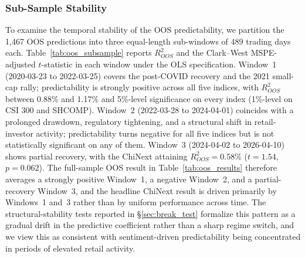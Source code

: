 \documentclass[AER]{AEA}
\begin{document}
\subsubsection{Sub-Sample Stability}
To examine the temporal stability of the OOS predictability, we partition the 1{,}467 OOS predictions into three equal-length sub-windows of 489 trading days each. Table~\ref{tab:oos_subsample} reports $R^2_{OOS}$ and the Clark--West MSPE-adjusted $t$-statistic in each window under the OLS specification. Window~1 (2020-03-23 to 2022-03-25) covers the post-COVID recovery and the 2021 small-cap rally; predictability is strongly positive across all five indices, with $R^2_{OOS}$ between 0.88\% and 1.17\% and 5\%-level significance on every index (1\%-level on CSI 300 and SHCOMP). Window~2 (2022-03-28 to 2024-04-01) coincides with a prolonged drawdown, regulatory tightening, and a structural shift in retail-investor activity; predictability turns negative for all five indices but is not statistically significant on any of them. Window~3 (2024-04-02 to 2026-04-10) shows partial recovery, with the ChiNext attaining $R^2_{OOS} = 0.58\%$ ($t = 1.54$, $p=0.062$). The full-sample OOS result in Table~\ref{tab:oos_results} therefore averages a strongly positive Window~1, a negative Window~2, and a partial-recovery Window~3, and the headline ChiNext result is driven primarily by Windows~1 and~3 rather than by uniform performance across time. The structural-stability tests reported in \S\ref{sec:break_test} formalize this pattern as a gradual drift in the predictive coefficient rather than a sharp regime switch, and we view this as consistent with sentiment-driven predictability being concentrated in periods of elevated retail activity.
\end{document}

